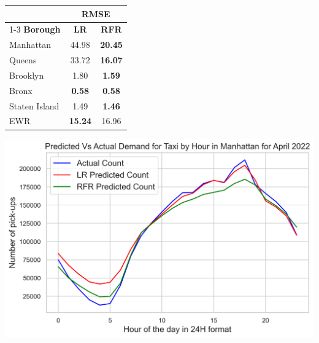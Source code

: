 \documentclass[11pt]{article}
\begin{document}
\vspace{0.5cm}
\begin{minipage}{\textwidth}
  \begin{minipage}[b]{0.5\textwidth}
  \centering
  \begin{tabular}{lcc}
  \toprule
    \multirow{3}{*}{} &
      \multicolumn{2}{c}{\bf RMSE} \\
      \cmidrule(lr){1-3}
      \bf Borough & \bf LR & \bf {RFR} \\
      \midrule
    Manhattan & {44.98} & {\bf 20.45} \\
    \hline
    Queens & {33.72} &  \bf 16.07 \\
    \hline
    Brooklyn & { 1.80} & \bf 1.59 \\
    \hline
    Bronx &  {\bf 0.58} & \bf 0.58\\
    \hline
    Staten Island &  {1.49} & \bf 1.46\\
    \hline
    EWR &  {\bf15.24} & 16.96\\
    \bottomrule
    
  \end{tabular}
      \label{Table2}
      \vspace{-0.3cm}
    \end{minipage}
  \hspace{-0.8cm}
  \begin{minipage}[t]{0.5\textwidth}
  \captionsetup{justification=centering}
    \includegraphics[width=1\linewidth]{plots/predicted_trend.png}
    
    \vspace{-0.3cm}
    \label{fig4}
  \end{minipage}
  
  \end{minipage}
\vspace{0.3cm}
\end{document}
